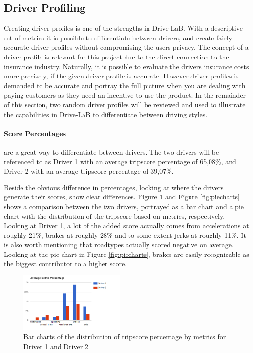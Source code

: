 \subsection{Driver Profiling}\label{subsec:userprofiling}

Creating driver profiles is one of the strengths in Drive-LaB. With a descriptive set of metrics it is possible to differentiate between drivers, and create fairly accurate driver profiles without compromising the users privacy. The concept of a driver profile is relevant for this project due to the direct connection to the insurance industry. Naturally, it is possible to evaluate the drivers insurance costs more precisely, if the given driver profile is accurate. However driver profiles is demanded to be accurate and portray the full picture when you are dealing with paying customers\citep{art:insurtelematics} as they need an incentive to use the product. In the remainder of this section, two random driver profiles will be reviewed and used to illustrate the capabilities in Drive-LaB to differentiate between driving styles.  

\paragraph{Score Percentages} are a great way to differentiate between drivers. The two drivers will be referenced to as Driver 1 with an average tripscore percentage of 65,08\%, and Driver 2 with an average tripscore percentage of 39,07\%.

Beside the obvious difference in percentages, looking at where the drivers generate their scores, show clear differences. Figure \ref{fig:avgmetricper} and Figure \ref{fig:piecharts} shows a comparison between the two drivers, portrayed as a bar chart and a pie chart with the distribution of the tripscore based on metrics, respectively. Looking at Driver 1, a lot of the added score actually comes from accelerations at roughly 21\%, brakes at roughly 28\% and to some extent jerks at roughly 11\%. It is also worth mentioning that roadtypes actually scored negative on average. Looking at the pie chart in Figure \ref{fig:piecharts}, brakes are easily recognizable as the biggest contributor to a higher score.

\begin{figure}[tb]
\centering
\includegraphics[width=0.465\textwidth]{Pictures/AverageMetricsPercentage}
\caption{Bar charts of the distribution of tripscore percentage by metrics for Driver 1 and Driver 2}
\label{fig:avgmetricper}
\end{figure}

